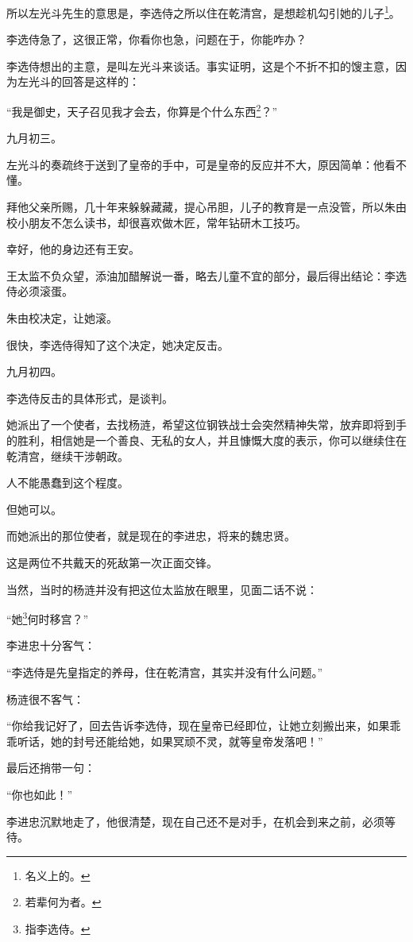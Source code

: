 \begin{multicols}{\theparacolNo}
		所以左光斗先生的意思是，李选侍之所以住在乾清宫，是想趁机勾引她的儿子\footnote{名义上的。}。

		李选侍急了，这很正常，你看你也急，问题在于，你能咋办？

		李选侍想出的主意，是叫左光斗来谈话。事实证明，这是个不折不扣的馊主意，因为左光斗的回答是这样的：

		“我是御史，天子召见我才会去，你算是个什么东西\footnote{若辈何为者。}？”

		九月初三。

		左光斗的奏疏终于送到了皇帝的手中，可是皇帝的反应并不大，原因简单：他看不懂。

		拜他父亲所赐，几十年来躲躲藏藏，提心吊胆，儿子的教育是一点没管，所以朱由校小朋友不怎么读书，却很喜欢做木匠，常年钻研木工技巧。

		幸好，他的身边还有王安。

		王太监不负众望，添油加醋解说一番，略去儿童不宜的部分，最后得出结论：李选侍必须滚蛋。

		朱由校决定，让她滚。

		很快，李选侍得知了这个决定，她决定反击。

		九月初四。

		李选侍反击的具体形式，是谈判。

		她派出了一个使者，去找杨涟，希望这位钢铁战士会突然精神失常，放弃即将到手的胜利，相信她是一个善良、无私的女人，并且慷慨大度的表示，你可以继续住在乾清宫，继续干涉朝政。

		人不能愚蠢到这个程度。

		但她可以。

		而她派出的那位使者，就是现在的李进忠，将来的魏忠贤。

		这是两位不共戴天的死敌第一次正面交锋。

		当然，当时的杨涟并没有把这位太监放在眼里，见面二话不说：

		“她\footnote{指李选侍。}何时移宫？”

		李进忠十分客气：

		“李选侍是先皇指定的养母，住在乾清宫，其实并没有什么问题。”

		杨涟很不客气：

		“你给我记好了，回去告诉李选侍，现在皇帝已经即位，让她立刻搬出来，如果乖乖听话，她的封号还能给她，如果冥顽不灵，就等皇帝发落吧！”

		最后还捎带一句：

		“你也如此！”

		李进忠沉默地走了，他很清楚，现在自己还不是对手，在机会到来之前，必须等待。


\end{multicols}
